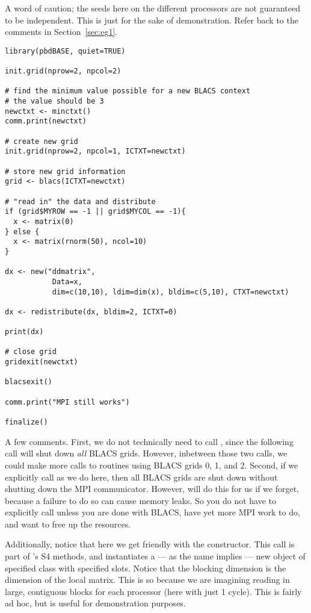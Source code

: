 A word of caution; the seeds here on the different processors are not guaranteed to be independent.  This is just for the sake of demonstration.  Refer back to the comments in Section~\ref{sec:eg1}.

\begin{lstlisting}[language=rr,title=Generating in Parallel]
library(pbdBASE, quiet=TRUE)

init.grid(nprow=2, npcol=2)

# find the minimum value possible for a new BLACS context
# the value should be 3
newctxt <- minctxt()
comm.print(newctxt)

# create new grid
init.grid(nprow=2, npcol=1, ICTXT=newctxt)

# store new grid information
grid <- blacs(ICTXT=newctxt)

# "read in" the data and distribute
if (grid$MYROW == -1 || grid$MYCOL == -1){
  x <- matrix(0)
} else {
  x <- matrix(rnorm(50), ncol=10)
}

dx <- new("ddmatrix", 
           Data=x, 
           dim=c(10,10), ldim=dim(x), bldim=c(5,10), CTXT=newctxt)

dx <- redistribute(dx, bldim=2, ICTXT=0)

print(dx)

# close grid
gridexit(newctxt)

blacsexit()

comm.print("MPI still works")

finalize()
\end{lstlisting}

A few comments.  First, we do not technically need to call , since the following  call will shut down \emph{all} BLACS grids.  However, inbetween those two calls, we could make more calls to routines using BLACS grids 0, 1, and 2.  Second, if we explicitly call  as we do here, then all BLACS grids are shut down without shutting down the MPI communicator.  However,  will do this for us if we forget, because a failure to do so can cause memory leaks.  So you do not have to explicitly call  unless you are done with BLACS, have yet more MPI work to do, and want to free up the resources.

Additionally, notice that here we get friendly with the  constructor.  This call is part of 's S4 methods, and instantiates a --- as the name implies --- new object of specified class with specified slots.  Notice that the blocking dimension is the dimension of the local matrix.  This is so because we are imagining reading in large, contiguous blocks for each processor (here with just 1 cycle).  This is fairly ad hoc, but is useful for demonstration purposes. 

